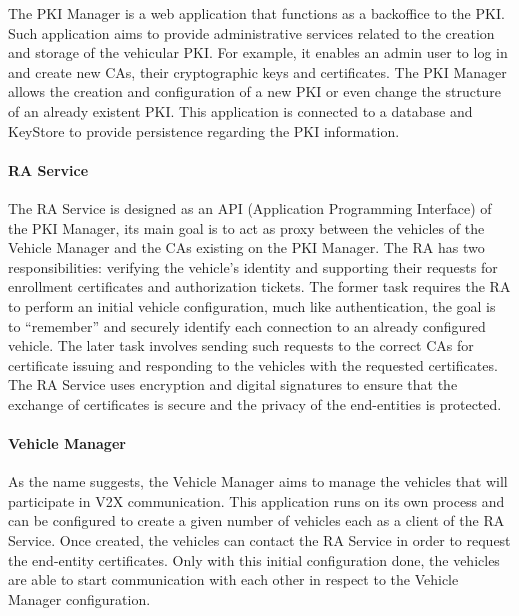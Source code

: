 The PKI Manager is a web application that functions as a backoffice to the PKI. Such application aims to provide administrative services related to the creation and storage of the vehicular PKI. For example, it enables an admin user to log in and create new CAs, their cryptographic keys and certificates. The PKI Manager allows the creation and configuration of a new PKI or even change the structure of an already existent PKI. This application is connected to a database and KeyStore to provide persistence regarding the PKI information.


\paragraph{RA Service}
\label{section:model}

The RA Service is designed as an API (Application Programming Interface) of the PKI Manager, its main goal is to act as proxy between the vehicles of the Vehicle Manager and the CAs existing on the PKI Manager. The RA has two responsibilities: verifying the vehicle's identity and supporting their requests for enrollment certificates and authorization tickets. The former task requires the RA to perform an initial vehicle configuration, much like authentication, the goal is to “remember” and securely identify each connection to an already configured vehicle. The later task involves sending such requests to the correct CAs for certificate issuing and responding to the vehicles with the requested certificates. The RA Service uses encryption and digital signatures to ensure that the exchange of certificates is secure and the privacy of the end-entities is protected.

\paragraph{Vehicle Manager}
\label{section:model}
As the name suggests, the Vehicle Manager aims to manage the vehicles that will participate in V2X communication. This application runs on its own process and can be configured to create a given number of vehicles each as a client of the RA Service. Once created, the vehicles can contact the RA Service in order to request the end-entity certificates. Only with this initial configuration done, the vehicles are able to start communication with each other in respect to the Vehicle Manager configuration.

